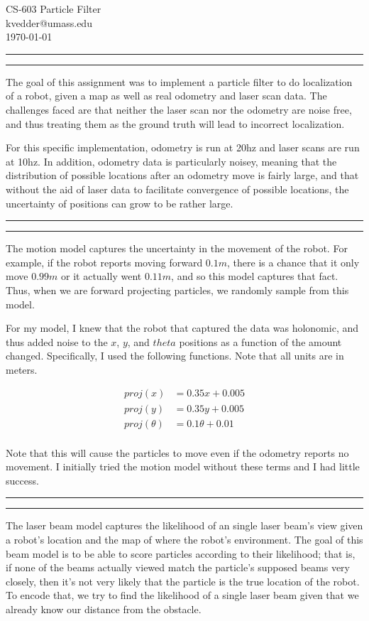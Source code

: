 \documentclass[11pt]{article}
\makeatletter
\newcommand{\topic}[1] {\vspace{.25in} \hrule\vspace{0.5em}
  \noindent{\bf #1} \vspace{0.5em}
  \hrule \vspace{.10in}}
\newcommand{\myaddress}{kvedder@umass.edu}
\makeatother
\begin{document}
\medskip 
\thispagestyle{plain}
\begin{center}
  {\Large CS-603 Particle Filter} \\
  \myaddress\\
  \today \\
\end{center}

\topic{Background}

The goal of this assignment was to implement a particle filter to do
localization of a robot, given a map as well as real odometry and laser scan
data. The challenges faced are that neither the laser scan nor the odometry are
noise free, and thus treating them as the ground truth will lead to incorrect
localization.

For this specific implementation, odometry is run at 20hz and laser scans are
run at 10hz. In addition, odometry data is particularly noisey,
meaning that the distribution of possible locations after an odometry move is
fairly large, and that without the aid of laser data to facilitate convergence
of possible locations, the uncertainty of positions can grow to be rather large.

\topic{Motion Model}

The motion model captures the uncertainty in the movement of the robot. For
example, if the robot reports moving forward $0.1m$, there is a chance that it
only move $0.99m$ or it actually went $0.11m$, and so this model captures that
fact. Thus, when we are forward projecting particles, we randomly sample from
this model.

For my model, I knew that the robot that captured the data was holonomic,
and thus added noise to the $x$, $y$, and $theta$ positions as a function of the
amount changed. Specifically, I used the following functions. Note that all
units are in meters.

\begin{align*}
  proj(x) &= 0.35x + 0.005\\
  proj(y) &= 0.35y + 0.005\\
  proj(\theta) &= 0.1\theta + 0.01\\
\end{align*}

Note that this will cause the particles to move even if the odometry reports
no movement. I initially tried the motion model without these terms and I had
little success.

\topic{Laser Beam Model}

The laser beam model captures the likelihood of an single laser beam's view
given a robot's location and the map of where the robot's environment. The goal
of this beam model is to be able to score particles according to their
likelihood; that is, if none of the beams actually viewed match the particle's
supposed beams very closely, then it's not very likely that the particle is the
true location of the robot. To encode that, we try to find the likelihood of a
single laser beam given that we already know our distance from the obstacle.
\end{document}
